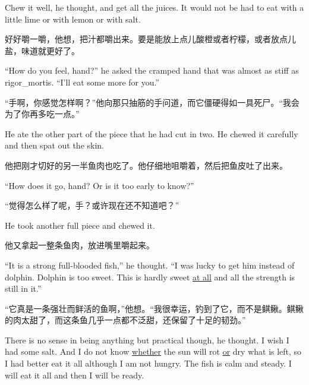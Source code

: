 \begin{paracol}{2}
\switchcolumn*

Chew it well, he thought, and get all the juices. It would not be had to eat
with a little \gls{lime} or with lemon or with salt.

\switchcolumn

好好嚼一嚼，他想，把汁都嚼出来。要是能放上点儿酸橙或者柠檬，或者放点儿盐，味道就更好了。

\switchcolumn*

``How do you feel, hand?'' he asked the cramped hand that was almost as
stiff as \gls{rigor_mortis}. ``I'll eat some more for you.''

\switchcolumn

“手啊，你感觉怎样啊？”他向那只抽筋的手问道，而它僵硬得如一具死尸。“我会为了你再多吃一点。”

\switchcolumn*

He ate the other part of the piece that he had cut in two. He chewed it
carefully and then spat out the skin.

\switchcolumn

他把刚才切好的另一半鱼肉也吃了。他仔细地咀嚼着，然后把鱼皮吐了出来。

\switchcolumn*

``How does it go, hand? Or is it too early to know?''

\switchcolumn

“觉得怎么样了呢，手？或许现在还不知道吧？”

\switchcolumn*

He took another full piece and chewed it.

\switchcolumn

他又拿起一整条鱼肉，放进嘴里嚼起来。

\switchcolumn*

``It is a strong \gls{full-blooded} fish,'' he thought. ``I was lucky to get him
\gls{instead} of dolphin. Dolphin is too sweet. This is hardly sweet \uline{at all} and
all the strength is still in it.''

\switchcolumn

“它真是一条强壮而鲜活的鱼啊，”他想。“我很幸运，钓到了它，而不是鲯鳅。鲯鳅的肉太甜了，而这条鱼几乎一点都不泛甜，还保留了十足的韧劲。”

\switchcolumn*

There is no sense in being anything but \gls{practical} though, he thought. I wish
I had some salt. And I do not know \uline{whether} the sun will \gls{rot} \uline{or} dry
what is left, so I had better eat it all although I am not hungry. The fish
is calm and steady. I will eat it all and then I will be ready.


\end{paracol}
